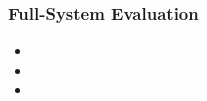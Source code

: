 \frametitle{Full-System Evaluation}

\begin{itemize}
    \item 
    \item 
    \item 
\end{itemize}
